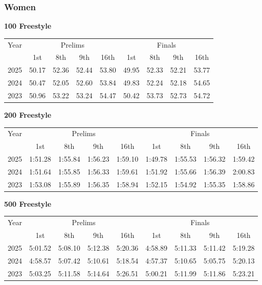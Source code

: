 \clearpage
\subsubsection{Women}

\clearpage
\textbf{100 Freestyle}

\begin{flushleft}
\begin{tabular}{|c|c|c|c|c|c|c|c|c|}
\hline
Year & \multicolumn{4}{c|}{Prelims} & \multicolumn{4}{c|}{Finals} \\
\cline{2-9}
& 1st & 8th & 9th & 16th & 1st & 8th & 9th & 16th \\
\hline
2025 & 50.17 & 52.36 & 52.44 & 53.80 & 49.95 & 52.33 & 52.21 & 53.77 \\
2024 & 50.47 & 52.05 & 52.60 & 53.84 & 49.83  & 52.24 & 52.18  & 54.65  \\
2023 & 50.96 & 53.22 & 53.24 & 54.47 & 50.42 & 53.73 & 52.73 & 54.72 \\
\hline
\end{tabular}
\end{flushleft}

\textbf{200 Freestyle}

\begin{flushleft}
\begin{tabular}{|c|c|c|c|c|c|c|c|c|}
\hline
Year & \multicolumn{4}{c|}{Prelims} & \multicolumn{4}{c|}{Finals} \\
\cline{2-9}
& 1st & 8th & 9th & 16th & 1st & 8th & 9th & 16th \\
\hline
2025 & 1:51.28 & 1:55.84 & 1:56.23 & 1:59.10 & 1:49.78 & 1:55.53 & 1:56.32 & 1:59.42 \\
2024 & 1:51.64 & 1:55.85 & 1:56.33 & 1:59.61 & 1:51.92 & 1:55.66 & 1:56.39 & 2:00.83 \\
2023 & 1:53.08 & 1:55.89 & 1:56.35 & 1:58.94 & 1:52.15 & 1:54.92 & 1:55.35 & 1:58.86 \\
\hline
\end{tabular}
\end{flushleft}

\textbf{500 Freestyle}

\begin{flushleft}
\begin{tabular}{|c|c|c|c|c|c|c|c|c|}
\hline
Year & \multicolumn{4}{c|}{Prelims} & \multicolumn{4}{c|}{Finals} \\
\cline{2-9}
& 1st & 8th & 9th & 16th & 1st & 8th & 9th & 16th \\
\hline
2025 & 5:01.52 & 5:08.10 & 5:12.38 & 5:20.36 & 4:58.89 & 5:11.33 & 5:11.42 & 5:19.28 \\
2024 & 4:58.57 & 5:07.42 & 5:10.61 & 5:18.54 & 4:57.37 & 5:10.65 & 5:05.75 & 5:20.13 \\
2023 & 5:03.25 & 5:11.58 & 5:14.64 & 5:26.51 & 5:00.21 & 5:11.99 & 5:11.86 & 5:23.21 \\
\hline
\end{tabular}
\end{flushleft}

